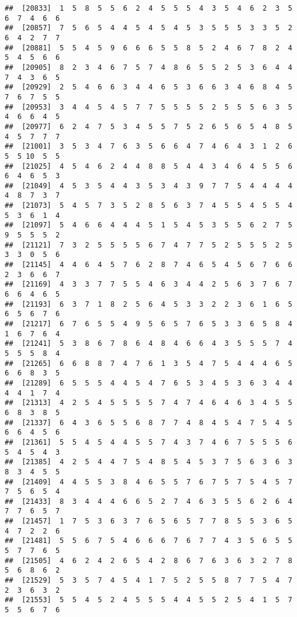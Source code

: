 \documentclass[
]{book}
\begin{document}
\begin{verbatim}
##  [20833]  1  5  8  5  5  6  2  4  5  5  5  4  3  5  4  6  2  3  5  6  7  4  6  6
##  [20857]  7  5  6  5  4  4  5  4  5  4  5  3  5  5  5  3  3  5  2  6  4  2  7  7
##  [20881]  5  5  4  5  9  6  6  6  5  5  8  5  2  4  6  7  8  2  4  5  4  5  6  6
##  [20905]  8  2  3  4  6  7  5  7  4  8  6  5  5  2  5  3  6  4  4  7  4  3  6  5
##  [20929]  2  5  4  6  6  3  4  4  6  5  3  6  6  3  4  6  8  4  5  7  6  7  5  5
##  [20953]  3  4  4  5  4  5  7  7  5  5  5  5  2  5  5  5  6  3  5  4  6  6  4  5
##  [20977]  6  2  4  7  5  3  4  5  5  7  5  2  6  5  6  5  4  8  5  4  5  7  7  7
##  [21001]  3  5  3  4  7  6  3  5  6  6  4  7  4  6  4  3  1  2  6  5  5 10  5  5
##  [21025]  4  5  4  6  2  4  4  8  8  5  4  4  3  4  6  4  5  5  6  6  4  6  5  3
##  [21049]  4  5  3  5  4  4  3  5  3  4  3  9  7  7  5  4  4  4  4  4  8  7  3  7
##  [21073]  5  4  5  7  3  5  2  8  5  6  3  7  4  5  5  4  5  5  4  5  3  6  1  4
##  [21097]  5  4  6  6  4  4  4  5  1  5  4  5  3  5  5  6  2  7  5  9  5  5  5  2
##  [21121]  7  3  2  5  5  5  5  6  7  4  7  7  5  2  5  5  5  2  5  3  3  0  5  6
##  [21145]  4  4  6  4  5  7  6  2  8  7  4  6  5  4  5  6  7  6  6  2  3  6  6  7
##  [21169]  4  3  3  7  7  5  5  4  6  3  4  4  2  5  6  3  7  6  7  6  6  4  6  5
##  [21193]  6  3  7  1  8  2  5  6  4  5  3  3  2  2  3  6  1  6  5  6  5  6  7  6
##  [21217]  6  7  6  5  5  4  9  5  6  5  7  6  5  3  3  6  5  8  4  1  6  7  6  4
##  [21241]  5  3  8  6  7  8  6  4  8  4  6  6  4  3  5  5  5  7  4  5  5  5  8  4
##  [21265]  6  6  8  8  7  4  7  6  1  3  5  4  7  5  4  4  4  6  5  6  6  8  3  5
##  [21289]  6  5  5  5  4  4  5  4  7  6  5  3  4  5  3  6  3  4  4  4  4  1  7  4
##  [21313]  4  2  5  4  5  5  5  5  7  4  7  4  6  4  6  3  4  5  5  6  8  3  8  5
##  [21337]  6  4  3  6  5  5  6  8  7  7  4  8  4  5  4  7  5  4  5  6  6  4  5  6
##  [21361]  5  5  4  5  4  4  5  5  7  4  3  7  4  6  7  5  5  5  6  5  4  5  4  3
##  [21385]  4  2  5  4  4  7  5  4  8  5  4  5  3  7  5  6  3  6  3  8  3  4  5  5
##  [21409]  4  4  5  5  3  8  4  6  5  5  7  6  7  5  7  5  4  5  7  7  5  6  5  4
##  [21433]  8  3  4  4  4  6  6  5  2  7  4  6  3  5  5  6  2  6  4  7  7  6  5  7
##  [21457]  1  7  5  3  6  3  7  6  5  6  5  7  7  8  5  5  3  6  5  4  7  2  2  6
##  [21481]  5  5  6  7  5  4  6  6  6  7  6  7  7  4  3  5  6  5  5  5  7  7  6  5
##  [21505]  4  6  2  4  2  6  5  4  2  8  6  7  6  3  6  3  2  7  8  5  6  8  6  2
##  [21529]  5  3  5  7  4  5  4  1  7  5  2  5  5  8  7  7  5  4  7  2  3  6  3  2
##  [21553]  5  5  4  5  2  4  5  5  5  4  4  5  5  2  5  4  1  5  7  5  5  6  7  6

\end{verbatim}
\end{document}
